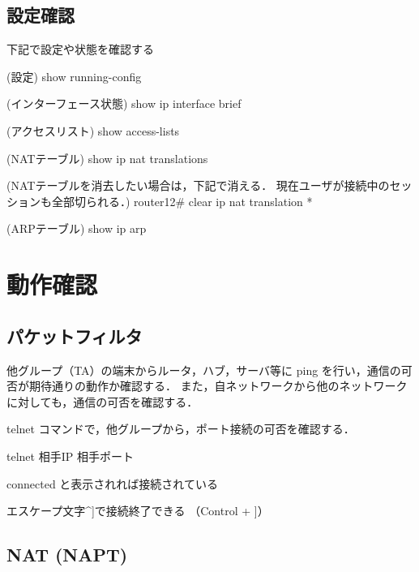 \subsection{設定確認}

\begin{cli}

下記で設定や状態を確認する

(設定)
show running-config

(インターフェース状態)
show ip interface brief

(アクセスリスト)
show access-lists

(NATテーブル)
show ip nat translations

(NATテーブルを消去したい場合は，下記で消える．
 現在ユーザが接続中のセッションも全部切られる．)
router12# clear ip nat translation *

(ARPテーブル)
show ip arp

\end{cli}


\section{動作確認}

\subsection*{パケットフィルタ}

他グループ（TA）の端末からルータ，ハブ，サーバ等に ping を行い，通信の可否が期待通りの動作か確認する．
また，自ネットワークから他のネットワークに対しても，通信の可否を確認する．

telnet コマンドで，他グループから，ポート接続の可否を確認する．

\begin{cli}
telnet 相手IP 相手ポート

connected と表示されれば接続されている

エスケープ文字^]で接続終了できる
（Control + ]）
\end{cli}

\subsection*{NAT (NAPT)}

